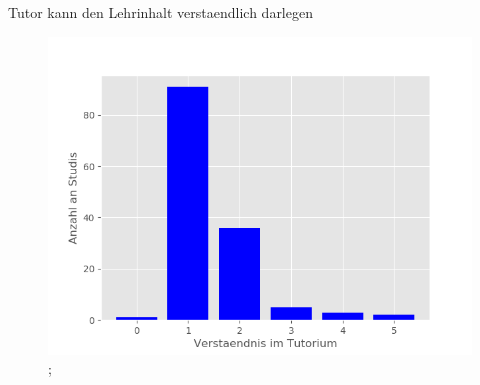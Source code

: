 \documentclass[10pt]{beamer}
\begin{document}
\begin{frame}[fragile]{Tutor kann den Lehrinhalt verstaendlich darlegen} 
 \begin{figure}
 \includegraphics[width= 0.9\linewidth]{./PDFcreater/Plots/Tutor+kann+den+Lehrinhalt+verstaendlich+darlegen.png};
 \end{figure}
 \end{frame}
\end{document}
